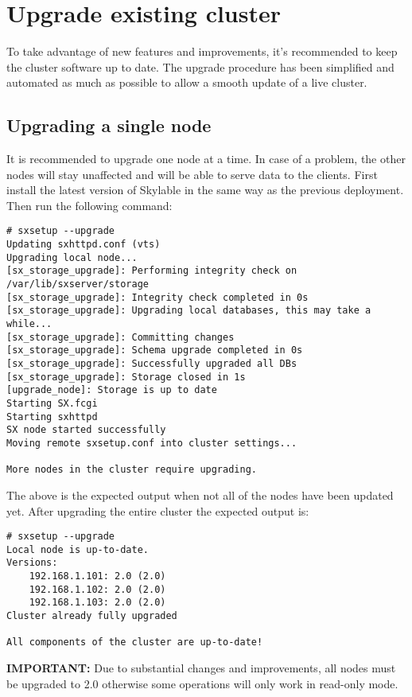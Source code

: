 \section{Upgrade existing cluster}
To take advantage of new features and improvements, it's recommended to
keep the cluster software up to date. The upgrade procedure has been
simplified and automated as much as possible to allow a smooth update
of a live cluster.
\subsection{Upgrading a single node}
It is recommended to upgrade one node at a time. In case of a problem, the
other nodes will stay unaffected and will be able to serve data to the
clients.
First install the latest version of Skylable \SX in the same way as the
previous deployment. Then run the following command:
\begin{lstlisting}
# sxsetup --upgrade
Updating sxhttpd.conf (vts)
Upgrading local node...
[sx_storage_upgrade]: Performing integrity check on /var/lib/sxserver/storage
[sx_storage_upgrade]: Integrity check completed in 0s
[sx_storage_upgrade]: Upgrading local databases, this may take a while...
[sx_storage_upgrade]: Committing changes
[sx_storage_upgrade]: Schema upgrade completed in 0s
[sx_storage_upgrade]: Successfully upgraded all DBs
[sx_storage_upgrade]: Storage closed in 1s
[upgrade_node]: Storage is up to date
Starting SX.fcgi
Starting sxhttpd
SX node started successfully
Moving remote sxsetup.conf into cluster settings...

More nodes in the cluster require upgrading.
\end{lstlisting}

The above is the expected output when not all of the nodes have been
updated yet. After upgrading the entire cluster the expected output is:
\begin{lstlisting}
# sxsetup --upgrade
Local node is up-to-date.
Versions:
	192.168.1.101: 2.0 (2.0)
	192.168.1.102: 2.0 (2.0)
	192.168.1.103: 2.0 (2.0)
Cluster already fully upgraded

All components of the cluster are up-to-date!
\end{lstlisting}
\textbf{IMPORTANT:} Due to substantial changes and improvements, all
nodes must be upgraded to 2.0 otherwise some operations will only work in
read-only mode.
